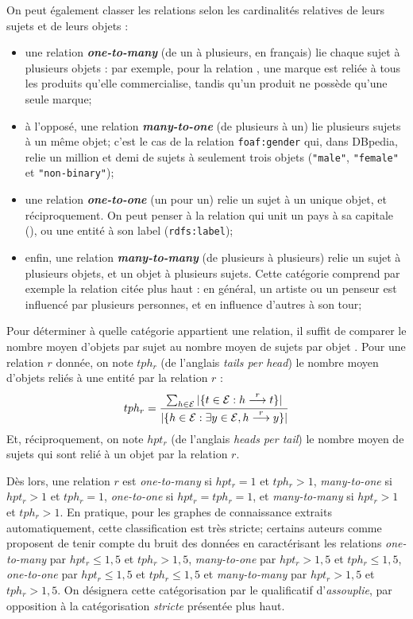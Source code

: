 On peut également classer les relations selon les cardinalités relatives de leurs sujets et de leurs objets :
\begin{itemize}
    \item une relation \textbf{\textit{one-to-many}} (de un à plusieurs, en français) lie chaque sujet à plusieurs objets : par exemple, pour la relation , 
    une marque est reliée à tous les produits qu'elle commercialise, tandis qu'un produit ne possède qu'une seule marque;
    \item à l'opposé, une relation \textbf{\textit{many-to-one}} (de plusieurs à un) lie plusieurs sujets à un même objet; c'est le cas de la relation \texttt{foaf:gender} qui, dans DBpedia, relie un million et demi de sujets à seulement trois objets (\texttt{"male"}, \texttt{"female"} et \texttt{"non-binary"});
    \item une relation \textbf{\textit{one-to-one}} (un pour un) relie un sujet à un unique objet, et réciproquement. On peut penser à la relation qui unit un pays à sa capitale (), ou une entité à son label (\texttt{rdfs:label});
    \item enfin, une relation \textbf{\textit{many-to-many}} (de plusieurs à plusieurs) relie un sujet à plusieurs objets, et un objet à plusieurs sujets. Cette catégorie comprend par exemple la relation  citée plus haut : en général, un artiste ou un penseur est influencé par plusieurs personnes, et en influence d'autres à son tour;
\end{itemize}

Pour déterminer à quelle catégorie appartient une relation, il suffit de comparer le nombre moyen d'objets par sujet au nombre moyen de sujets par objet \cite{transh}. Pour une relation $r$ donnée, on note $tph_r$ (de l'anglais \textit{tails per head}) le nombre moyen d'objets reliés à une entité par la relation $r$ :
\begin{equation}
    tph_r = \frac{\sum_{h \in \mathcal{E}} |\{ t \in \mathcal{E} : h \overset{r}{\longrightarrow} t \}|}{|\{ h \in \mathcal{E} : \exists y \in \mathcal{E}, h \overset{r}{\longrightarrow} y \}| }
\end{equation}
Et, réciproquement, on note $hpt_r$ (de l'anglais \textit{heads per tail}) le nombre moyen de sujets qui sont relié à un objet par la relation $r$. 

Dès lors, une relation $r$ est \textit{one-to-many} si $hpt_r = 1$ et $tph_r > 1$, \textit{many-to-one} si $hpt_r > 1$ et $tph_r = 1$, \textit{one-to-one} si $hpt_r = tph_r = 1$, et \textit{many-to-many} si $hpt_r > 1$ et $tph_r > 1$. En pratique, pour les graphes de connaissance extraits automatiquement, cette classification est très stricte; certains auteurs comme \cite{bordes2013translating, transh} proposent de tenir compte du bruit des données en caractérisant les relations \textit{one-to-many} par $hpt_r \leq 1,5$ et $tph_r > 1,5$, \textit{many-to-one} par $hpt_r > 1,5$ et $tph_r \leq 1,5$, \textit{one-to-one} par $hpt_r \leq 1,5$ et $tph_r \leq  1,5$ et \textit{many-to-many} par $hpt_r > 1,5$ et $tph_r > 1,5$. On désignera cette catégorisation par le qualificatif d'\textit{assouplie}, par opposition à la catégorisation \textit{stricte} présentée plus haut.

